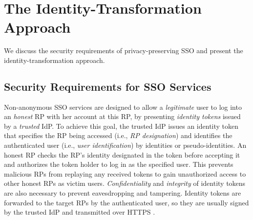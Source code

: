 \section{The Identity-Transformation Approach}
\label{sec:challenge}

We discuss the security requirements of privacy-preserving SSO and present the identity-transformation approach.


\subsection{Security Requirements for SSO Services}
\label{subsec:basicrequirements}

Non-anonymous SSO services \cite{OpenIDConnect,rfc6749,SAML,SAMLIdentifier,NIST2017draft} are designed to allow a \emph{legitimate} user to log into an \emph{honest} RP with her account at this RP, %
by presenting \emph{identity tokens} issued by a \emph{trusted} IdP.
To achieve this goal, the trusted IdP issues an identity token that specifies the RP being accessed (i.e., \emph{RP designation}) and identifies the authenticated user (i.e., \emph{user identification})
        by identities or pseudo-identities.
An honest RP checks the RP's identity designated in the token before accepting it and authorizes the token holder to log in as the specified user. This prevents malicious RPs from replaying any received tokens to gain unauthorized access to other honest RPs as victim users.
\emph{Confidentiality} and \emph{integrity} of identity tokens are also necessary to prevent eavesdropping and tampering. Identity tokens are forwarded to the target RPs by the authenticated user, so they are usually signed by the trusted IdP and transmitted over HTTPS \cite{OpenIDConnect, rfc6749, SAML}.


